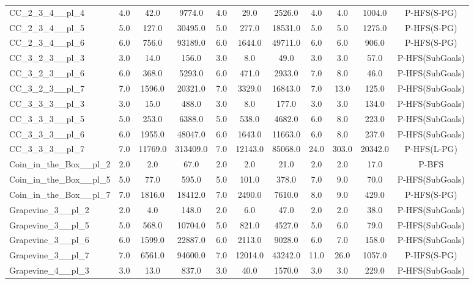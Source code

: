 \begin{table}[!ht]
\begin{tabular}{l|ccc|ccc|cccc}
CC\_2\_3\_4\_\_pl\_4 & 4.0 & 42.0 & 9774.0 & 4.0 & 29.0 & 2526.0 & 4.0 & 4.0 & 1004.0 & P-HFS(S-PG) \\
CC\_2\_3\_4\_\_pl\_5 & 5.0 & 127.0 & 30495.0 & 5.0 & 277.0 & 18531.0 & 5.0 & 5.0 & 1275.0 & P-HFS(S-PG) \\
CC\_2\_3\_4\_\_pl\_6 & 6.0 & 756.0 & 93189.0 & 6.0 & 1644.0 & 49711.0 & 6.0 & 6.0 & 906.0 & P-HFS(S-PG) \\
CC\_3\_2\_3\_\_pl\_3 & 3.0 & 14.0 & 156.0 & 3.0 & 8.0 & 49.0 & 3.0 & 3.0 & 57.0 & P-HFS(SubGoals) \\
CC\_3\_2\_3\_\_pl\_6 & 6.0 & 368.0 & 5293.0 & 6.0 & 471.0 & 2933.0 & 7.0 & 8.0 & 46.0 & P-HFS(SubGoals) \\
CC\_3\_2\_3\_\_pl\_7 & 7.0 & 1596.0 & 20321.0 & 7.0 & 3329.0 & 16843.0 & 7.0 & 13.0 & 125.0 & P-HFS(SubGoals) \\
CC\_3\_3\_3\_\_pl\_3 & 3.0 & 15.0 & 488.0 & 3.0 & 8.0 & 177.0 & 3.0 & 3.0 & 134.0 & P-HFS(SubGoals) \\
CC\_3\_3\_3\_\_pl\_5 & 5.0 & 253.0 & 6388.0 & 5.0 & 538.0 & 4682.0 & 6.0 & 8.0 & 223.0 & P-HFS(SubGoals) \\
CC\_3\_3\_3\_\_pl\_6 & 6.0 & 1955.0 & 48047.0 & 6.0 & 1643.0 & 11663.0 & 6.0 & 8.0 & 237.0 & P-HFS(SubGoals) \\
CC\_3\_3\_3\_\_pl\_7 & 7.0 & 11769.0 & 313409.0 & 7.0 & 12143.0 & 85068.0 & 24.0 & 303.0 & 20342.0 & P-HFS(L-PG) \\
Coin\_in\_the\_Box\_\_pl\_2 & 2.0 & 2.0 & 67.0 & 2.0 & 2.0 & 21.0 & 2.0 & 2.0 & 17.0 & P-BFS \\
Coin\_in\_the\_Box\_\_pl\_5 & 5.0 & 77.0 & 595.0 & 5.0 & 101.0 & 378.0 & 7.0 & 9.0 & 70.0 & P-HFS(SubGoals) \\
Coin\_in\_the\_Box\_\_pl\_7 & 7.0 & 1816.0 & 18412.0 & 7.0 & 2490.0 & 7610.0 & 8.0 & 9.0 & 429.0 & P-HFS(S-PG) \\
Grapevine\_3\_\_pl\_2 & 2.0 & 4.0 & 148.0 & 2.0 & 6.0 & 47.0 & 2.0 & 2.0 & 38.0 & P-HFS(SubGoals) \\
Grapevine\_3\_\_pl\_5 & 5.0 & 568.0 & 10704.0 & 5.0 & 821.0 & 4527.0 & 5.0 & 6.0 & 79.0 & P-HFS(SubGoals) \\
Grapevine\_3\_\_pl\_6 & 6.0 & 1599.0 & 22887.0 & 6.0 & 2113.0 & 9028.0 & 6.0 & 7.0 & 158.0 & P-HFS(SubGoals) \\
Grapevine\_3\_\_pl\_7 & 7.0 & 6561.0 & 94600.0 & 7.0 & 12014.0 & 43242.0 & 11.0 & 26.0 & 1057.0 & P-HFS(S-PG) \\
Grapevine\_4\_\_pl\_3 & 3.0 & 13.0 & 837.0 & 3.0 & 40.0 & 1570.0 & 3.0 & 3.0 & 229.0 & P-HFS(SubGoals) \\

\end{tabular}
\end{table}
